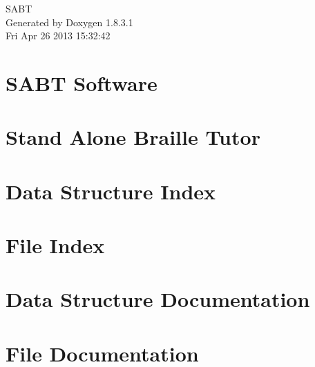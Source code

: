 \documentclass{book}
\begin{document}
\hypersetup{pageanchor=false,citecolor=blue}
\begin{titlepage}
\vspace*{7cm}
\begin{center}
{\Large S\-A\-B\-T }\\
\vspace*{1cm}
{\large Generated by Doxygen 1.8.3.1}\\
\vspace*{0.5cm}
{\small Fri Apr 26 2013 15:32:42}\\
\end{center}
\end{titlepage}
\clearemptydoublepage
{}
\tableofcontents
\clearemptydoublepage
{}
\hypersetup{pageanchor=true,citecolor=blue}
\chapter{S\-A\-B\-T Software}
\label{index}\hypertarget{index}{}
\chapter{Stand Alone Braille Tutor}
\label{md_README}
\hypertarget{md_README}{}

\chapter{Data Structure Index}

\chapter{File Index}

\chapter{Data Structure Documentation}





\chapter{File Documentation}






























\printindex
\end{document}
